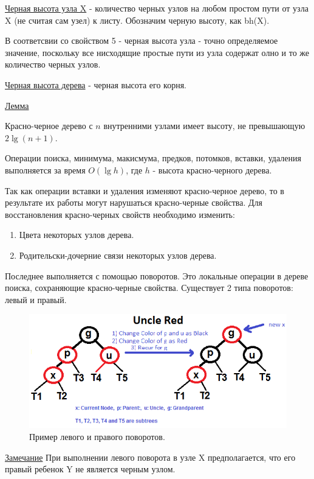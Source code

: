 \underline{Черная высота узла X} - количество черных узлов на любом простом 
пути от узла X (не считая сам узел) к листу. Обозначим черную высоту,
как bh(X).

В соответсвии со свойством 5 - черная высота узла - точно определяемое значение,
поскольку все нисходящие простые пути из узла содержат олно и то же 
количество черных узлов.

\underline{Черная высота дерева} - черная высота его корня.

\underline{Лемма}

Красно-черное дерево с $n$ внутренними узлами имеет высоту, не превышающую 
$2\lg(n+1)$.

Операции поиска, минимума, макисмума, предков, потомков, вставки, удаления выполняется 
за время $O(\lg h)$, где $h$ - высота красно-черного дерева.

Так как операции вставки и удаления изменяют красно-черное дерево,
то в результате их работы могут нарушаться красно-черные свойства. 
Для восстановления красно-черных свойств необходимо изменить:
\begin{enumerate}
	\item Цвета некоторых узлов дерева.
	\item Родительски-дочерние связи некоторых узлов дерева.
\end{enumerate}

Последнее выполняется с помощью поворотов. Это локальные операции в
дереве поиска, сохраняющие красно-черные свойства.
Существует 2 типа поворотов: левый и правый.

\begin{figure}[H]
\centering
\includegraphics[width=\textwidth]{img/tan-aus.png}
\caption{\label{fig:tan-aus}Пример левого и правого поворотов.}
\end{figure}

\underline{Замечание}
	При выполнении левого поворота в узле X предполагается, что
	его правый ребенок Y не является черным узлом.
	
